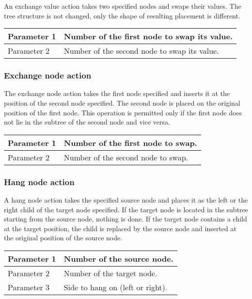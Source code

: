 An exchange value action takes two specified nodes and swaps their values. The tree structure is not changed, only the shape of resulting placement is different.

\noindent
\begin{tabular}{|l|l|}
\hline
Parameter 1 & Number of the first node to swap its value. \\
\hline
Parameter 2 & Number of the second node to swap its value. \\
\hline
\end{tabular}

\subsubsection{Exchange node action}

The exchange node action takes the first node specified and inserts it at the position of the second node specified. The second node is placed on the original position of the first node. This operation is permitted only if the first node does not lie in the subtree of the second node and vice versa.

\noindent
\begin{tabular}{|l|l|}
\hline
Parameter 1 & Number of the first node to swap. \\
\hline
Parameter 2 & Number of the second node to swap. \\
\hline
\end{tabular}

\subsubsection{Hang node action}

A hang node action takes the specified source node and places it as the left or the right child of the target node specified. If the target node is located in the subtree starting from the source node, nothing is done. If the target node contains a child at the target position, the child is replaced by the source node and inserted at the original position of the source node.

\noindent
\begin{tabular}{|l|l|}
\hline
Parameter 1 & Number of the source node. \\
\hline
Parameter 2 & Number of the target node. \\
\hline
Parameter 3 & Side to hang on (left or right). \\
\hline
\end{tabular}

